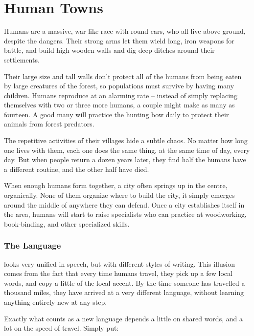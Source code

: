 \section[Humans]{Human Towns \Hu}
\label{humanTowns}

\begin{multicols}{2}
\renewcommand\npcsymbol{\Hu}

\noindent
Humans are a massive, war-like race with round ears, who all live above ground, despite the dangers.
Their strong arms let them wield long, iron weapons for battle, and build high wooden walls and dig deep ditches around their settlements.

Their large size and tall walls don't protect all of the humans from being eaten by large creatures of the forest, so populations must survive by having many children.
Humans reproduce at an alarming rate -- instead of simply replacing themselves with two or three more humans, a couple might make as many as fourteen.
A good many will practice the hunting bow daily to protect their animals from forest predators.

The repetitive activities of their \glspl{village} hide a subtle chaos.
No matter how long one lives with them, each one does the same thing, at the same time of day, every day.
But when people return a dozen years later, they find half the humans have a different routine, and the other half have died.

When enough humans form together, a city often springs up in the centre, organically.
None of them organize where to build the city, it simply emerges around the middle of anywhere they can defend.
Once a city establishes itself in the area, humans will start to raise specialists who can practice at woodworking, book-binding, and other specialized skills.


\subsubsection{The Language}
looks very unified in speech, but with different styles of writing.
This illusion comes from the fact that every time humans travel, they pick up a few local words, and copy a little of the local accent.
By the time someone has travelled a thousand miles, they have arrived at a very different language, without learning anything entirely new at any step.

Exactly what counts as a new language depends a little on shared words, and a lot on the speed of travel.
Simply put:


\end{multicols}
